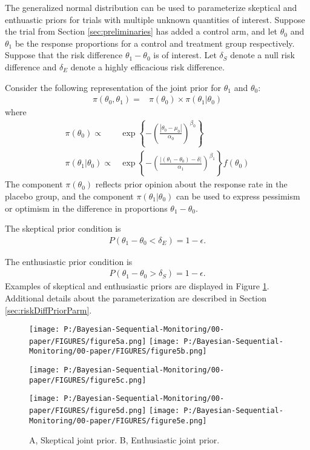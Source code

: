 \documentclass[12pt]{article}
\begin{document}
%
The generalized normal distribution can be used to parameterize skeptical and enthuastic priors for trials with multiple unknown quantities of interest. Suppose the trial from Section \ref{sec:preliminaries} has added a control arm, and let $\theta_0$ and $\theta_1$ be the response proportions for a control and treatment group respectively. Suppose that the risk difference $\theta_1-\theta_0$ is of interest. Let $\delta_{S}$ denote a null risk difference and $\delta_{E}$ denote a highly efficacious risk difference.


Consider the following representation of the joint prior for $\theta_1$ and $\theta_0$:
\begin{align}
\pi(\theta_0,\theta_1)=&\pi(\theta_0)\times\pi(\theta_1|\theta_0) \label{eq:generalized_normal_joint}
\end{align}
where
\begin{align}
\pi(\theta_0)\propto&\exp\left\{-\left(\frac{|\theta_0-\mu_0|}{\alpha_0}\right)^{\beta_0}\right\} \label{eq:generalized_normal_PC}\\
\pi(\theta_1|\theta_0)\propto&\exp\left\{-\left(\frac{|(\theta_1-\theta_0)-\delta|}{\alpha_1}\right)^{\beta_1}\right\}f(\theta_0) \label{eq:generalized_normal_IP}
\end{align}
The component $\pi(\theta_0)$ reflects prior opinion about the response rate in the placebo group, and the component $\pi(\theta_1|\theta_0)$ can be used to express pessimism or optimism in the difference in proportions $\theta_1 - \theta_0$. 

The skeptical prior condition is
\begin{align}
P(\theta_1-\theta_0<\delta_E)=1-\epsilon.
\end{align}

The enthusiastic prior condition is
\begin{align}
P(\theta_1-\theta_0>\delta_S)=1-\epsilon.
\end{align}
Examples of skeptical and enthusiastic priors are displayed in Figure \ref{fig:figure5}. Additional details about the parameterization are described in Section \ref{sec:riskDiffPriorParm}.

\begin{figure}
\texttt{[image: P:/Bayesian-Sequential-Monitoring/00-paper/FIGURES/figure5a.png]}
\texttt{[image: P:/Bayesian-Sequential-Monitoring/00-paper/FIGURES/figure5b.png]}

\texttt{[image: P:/Bayesian-Sequential-Monitoring/00-paper/FIGURES/figure5c.png]}

\texttt{[image: P:/Bayesian-Sequential-Monitoring/00-paper/FIGURES/figure5d.png]}
\texttt{[image: P:/Bayesian-Sequential-Monitoring/00-paper/FIGURES/figure5e.png]}
\caption{A, Skeptical joint prior. B, Enthusiastic joint prior.}
\label{fig:figure5}
 \end{figure}
\end{document}
